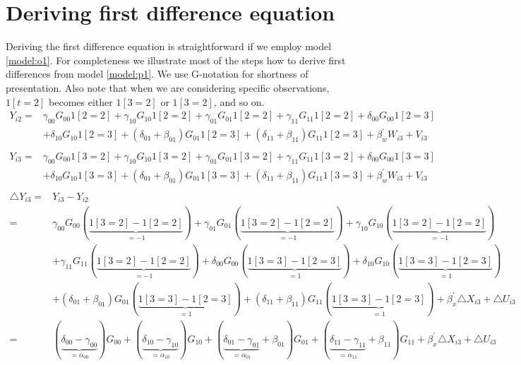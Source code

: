 \documentclass[12pt]{article}
\begin{document}
\section{Deriving first difference equation}\label{appendix:fd:eq}
Deriving the first difference equation is straightforward if we employ model \ref{model:o1}. For completeness we illustrate most of the steps how to derive first differences from model \ref{model:p1}. We use G-notation for shortness of presentation. Also note that when we are considering specific observations, $1[t=2]$ becomes either $1[3=2]$ or $1[3=2]$, and so on. 
\begin{equation*}
\begin{split}
Y_{i2}  = &\gamma_{00}G_{00}1[2=2] + \gamma_{10}G_{10}1[2=2] + \gamma_{01}G_{01}1[2=2] + \gamma_{11}G_{11}1[2=2] + \delta_{00}G_{00}1[2=3] \\
& + \delta_{10}G_{10}1[2=3] + (\delta_{01}+\beta_{01})G_{01}1[2=3] + (\delta_{11}+\beta_{11})G_{11}1[2=3] + \beta_w^\prime W_{i3} + V_{i3}\\
\end{split} 
\end{equation*}
\begin{equation*}
\begin{split}
Y_{i3}  = &\gamma_{00}G_{00}1[3=2] + \gamma_{10}G_{10}1[3=2] + \gamma_{01}G_{01}1[3=2] + \gamma_{11}G_{11}1[3=2] + \delta_{00}G_{00}1[3=3] \\
& + \delta_{10}G_{10}1[3=3] + (\delta_{01}+\beta_{01})G_{01}1[3=3] + (\delta_{11}+\beta_{11})G_{11}1[3=3] + \beta_w^\prime W_{i3} + V_{i3} \\
\end{split} 
\end{equation*}
\begin{equation*}
\begin{split}
\triangle Y_{i3} = &  Y_{i3} - Y_{i2}\\
 = & \gamma_{00}G_{00}(\underset{=-1}{\underbrace{1[3=2]-1[2=2]}})+\gamma_{01}G_{01}(\underset{=-1}{\underbrace{1[3=2]-1[2=2]}})+ \gamma_{10}G_{10}(\underset{=-1}{\underbrace{1[3=2]-1[2=2]}}) \\
 & +\gamma_{11}G_{11}(\underset{=-1}{\underbrace{1[3=2]-1[2=2]}}) + \delta_{00}G_{00}(\underset{=1}{\underbrace{1[3=3]-1[2=3]}})+
 \delta_{10}G_{10}(\underset{=1}{\underbrace{1[3=3]-1[2=3]}}) \\
 & + (\delta_{01}+\beta_{01})G_{01}(\underset{=1}{\underbrace{1[3=3]-1[2=3]}}) + (\delta_{11}+\beta_{11})G_{11}(\underset{=1}{\underbrace{1[3=3]-1[2=3]}}) + \beta_x^\prime \triangle X_{i3} + \triangle U_{i3}\\
 = & (\underset{=\alpha_{00}}{\underbrace{\delta_{00}-\gamma_{00}}})G_{00} + (\underset{=\alpha_{10}}{\underbrace{\delta_{10}-\gamma_{10}}}) G_{10} + (\underset{=\alpha_{01}}{\underbrace{\delta_{01}-\gamma_{01}}}+\beta_{01}) G_{01}  + 
 (\underset{=\alpha_{11}}{\underbrace{\delta_{11}-\gamma_{11}}}+\beta_{11}) G_{11} + \beta_x^\prime \triangle X_{i3} + \triangle U_{i3}
\end{split} 
\end{equation*}
\end{document}
